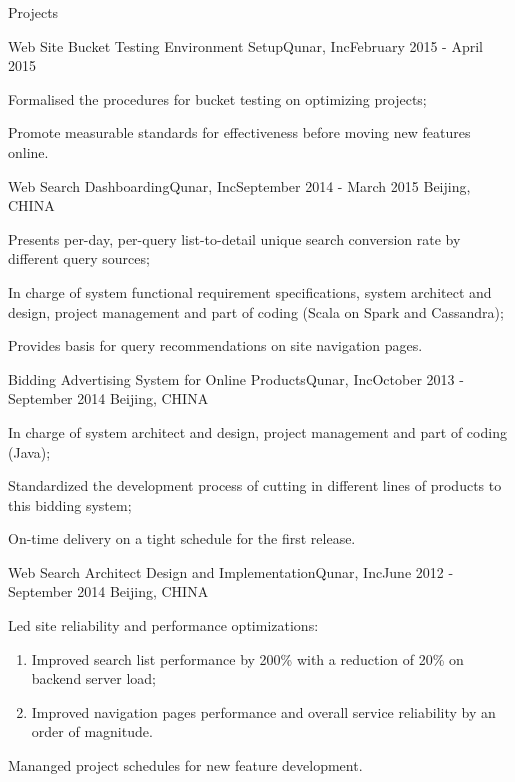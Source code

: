 \documentclass{resume} %
\begin{document}
\begin{rSection}{Projects}

\begin{rSubsection}{Web Site Bucket Testing Environment Setup}{Qunar, Inc}{February 2015 - April 2015}

\item Formalised the procedures for bucket testing on optimizing projects;
\item Promote measurable standards for effectiveness before moving new features online.

\end{rSubsection}

\begin{rSubsection}{Web Search Dashboarding}{Qunar, Inc}{September 2014 - March 2015}
{Beijing, CHINA}
\item Presents per-day, per-query list-to-detail unique search conversion rate by different query sources;
\item In charge of system functional requirement specifications, system architect and design, project management and part of coding (Scala on Spark and Cassandra);
\item Provides basis for query recommendations on site navigation pages.
\end{rSubsection}

\begin{rSubsection}{Bidding Advertising System for Online Products}{Qunar, Inc}{October 2013 - September 2014}
{Beijing, CHINA}
\item In charge of system architect and design, project management and part of coding (Java);
\item Standardized the development process of cutting in different lines of products to this bidding system;
\item On-time delivery on a tight schedule for the first release.
\end{rSubsection}

\begin{rSubsection}{Web Search Architect Design and Implementation}{Qunar, Inc}{June 2012 - September 2014}
{Beijing, CHINA}
\item Led site reliability and performance optimizations:
  \begin{enumerate}
    \item Improved search list performance by 200\% with a reduction of 20\% on backend server load;
    \item Improved navigation pages performance and overall service reliability by an order of magnitude.
  \end{enumerate}
\item Mananged project schedules for new feature development.


\end{rSubsection}
\end{rSection}
\end{document}

